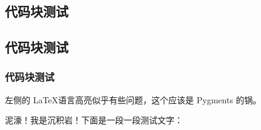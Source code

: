 \begin{multicols*}{2}
\section{ 代码块测试}

\subsection{ 代码块测试}

\subsubsection{ 代码块测试}





左侧的 \LaTeX 语言高亮似乎有些问题，这个应该是 Pygments 的锅\rlap。




泥濠！我是沉积岩！下面是一段一段测试文字：%
\codeinline[haskell]{lst = [x| x <- }
\codeinline[haskell]{['a'..'g']] -- by 沉积岩}\ 
\end{multicols*}

\begin{multicols*}{3}



\end{multicols*}

\newpage